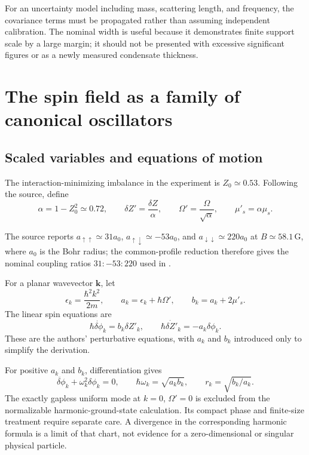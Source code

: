 \documentclass[11pt,a4paper]{article}
\theoremstyle{definition}
\theoremstyle{remark}
\newcommand{\musp}{\mu'_s}
\begin{document}
For an uncertainty model including mass, scattering length, and frequency, the covariance terms must be propagated rather than assuming independent calibration. The nominal width is useful because it demonstrates finite support scale by a large margin; it should not be presented with excessive significant figures or as a newly measured condensate thickness.

\section{The spin field as a family of canonical oscillators}
\label{sec:spin}
\subsection{Scaled variables and equations of motion}
The interaction-minimizing imbalance in the experiment is $Z_0\simeq0.53$. Following the source, define
\begin{equation}
 \alpha=1-Z_0^2\simeq0.72,\qquad
 \delta Z'=\frac{\delta Z}{\alpha},\qquad
 \Omega'=\frac{\Omega}{\sqrt\alpha},\qquad
 \musp=\alpha\mu_s.
 \label{eq:scaled}
\end{equation}

The source reports $a_{\uparrow\uparrow}\simeq31a_0$, $a_{\uparrow\downarrow}\simeq-53a_0$, and $a_{\downarrow\downarrow}\simeq220a_0$ at $B\simeq58.1\,\mathrm G$, where $a_0$ is the Bohr radius; the common-profile reduction therefore gives the nominal coupling ratios $31:-53:220$ used in .\cite{zhang2026}

For a planar wavevector $\boldsymbol k$, let
\begin{equation}
 \epsilon_k=\frac{\hbar^2k^2}{2m},\qquad
 a_k=\epsilon_k+\hbar\Omega',\qquad
 b_k=a_k+2\musp.
 \label{eq:ab}
\end{equation}
The linear spin equations are
\begin{equation}
 \hbar\dot{\delta\phi}_k=b_k\delta Z'_k,
 \qquad
 \hbar\dot{\delta Z'}_k=-a_k\delta\phi_k.
 \label{eq:spin_motion}
\end{equation}
These are the authors' perturbative equations, with $a_k$ and $b_k$ introduced only to simplify the derivation.\cite{zhang2026}

For positive $a_k$ and $b_k$, differentiation gives
\begin{equation}
 \ddot{\delta\phi}_k+\omega_k^2\delta\phi_k=0,
 \qquad \hbar\omega_k=\sqrt{a_kb_k},\qquad
 r_k=\sqrt{b_k/a_k}.
 \label{eq:dispersion}
\end{equation}
The exactly gapless uniform mode at $k=0$, $\Omega'=0$ is excluded from the normalizable harmonic-ground-state calculation. Its compact phase and finite-size treatment require separate care. A divergence in the corresponding harmonic formula is a limit of that chart, not evidence for a zero-dimensional or singular physical particle.
\end{document}
